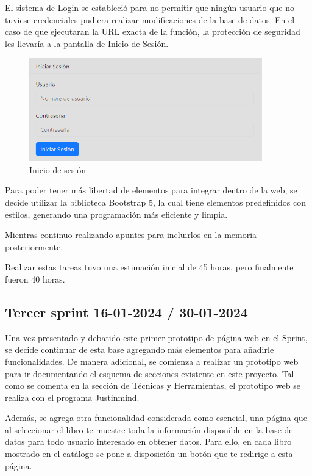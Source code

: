 El sistema de Login se estableció para no permitir que ningún usuario que no tuviese credenciales pudiera realizar modificaciones de la base de datos. En el caso de que ejecutaran la URL exacta de la función, la protección de seguridad les llevaría a la pantalla de Inicio de Sesión.

\begin{figure}[h]
    \centering
    \includegraphics[width=0.9\textwidth]{Imagenes/Inicio_Sesion.png}
    \caption{Inicio de sesión}
    \label{fig:Inicio de sesión}
\end{figure}

Para poder tener más libertad de elementos para integrar dentro de la web, se decide utilizar la biblioteca Bootstrap 5, la cual tiene elementos predefinidos con estilos, generando una programación más eficiente y limpia.

Mientras continuo realizando apuntes para incluirlos en la memoria posteriormente.

Realizar estas tareas tuvo una estimación inicial de 45 horas, pero finalmente fueron 40 horas.

\subsection{Tercer sprint 16-01-2024 / 30-01-2024}

Una vez presentado y debatido este primer prototipo de página web en el Sprint, se decide continuar de esta base agregando más elementos para añadirle funcionalidades. De manera adicional, se comienza a realizar un prototipo web para ir documentando el esquema de secciones existente en este proyecto. Tal como se comenta en la sección de Técnicas y Herramientas,  el prototipo web se realiza con el programa Justinmind.

Además, se agrega otra funcionalidad considerada como esencial, una página que al seleccionar el libro te muestre toda la información disponible en la base de datos para todo usuario interesado en obtener datos.
Para ello, en cada libro mostrado en el catálogo se pone a disposición un botón que te redirige a esta página.


